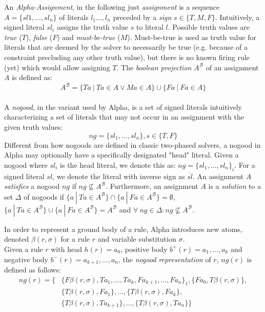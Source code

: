 \begin{definition}
\label{def:prelims-alpha-nogood}	
An \emph{Alpha-Assignment}, in the following just \emph{assignment} is a sequence $A = \{sl1,\ldots,sl_n\}$ of literals $l_1\ldots,l_n$ preceded by a \emph{sign} $s \in \{T, M, F\}$. Intuitively, a signed literal $sl_i$ assigns the truth value $s$ to literal $l$. Possible truth values are \emph{true} ($T$), \emph{false} ($F$) and \emph{must-be-true} ($M$). Must-be-true is used as truth value for literals that are deemed by the solver to necessarily be true (e.g. because of a constraint precluding any other truth value), but there is no known firing rule (yet) which would allow assigning $T$. The \emph{boolean projection} $A^{\mathcal{B}}$ of an assignment $A$ is defined as: 
\[
	A^{\mathcal{B}} = \{ Ta~|~Ta \in A \lor Ma \in A\} \cup \{ Fa~|~Fa \in A\}
\]
\\
A \emph{nogood}, in the variant used by Alpha, is a set of signed literals intuitively characterizing a set of literals that may not occur in an assignment with the given truth values:
\[
	ng = \{ sl_1,\ldots,sl_n \}, s \in \{T, F\}
\]
Different from how nogoods are defined in classic two-phased solvers, a nogood in Alpha may optionally have a specifically designated "head" literal. Given a nogood where $sl_i$ is the head literal, we denote this as: $ng = \{ sl_1,\ldots,sl_n \}_i$. For a signed literal $sl$, we denote the literal with inverse sign as $\overline{sl}$.
An assignment $A$ \emph{satisfies} a nogood $ng$ if $ng \nsubseteq A^{\mathcal{B}}$. Furthermore, an assignment $A$ is a \emph{solution} to a set $\Delta$ of nogoods if $\{a~|~Ta \in A^{\mathcal{B}}\} \cap \{a~|~Fa \in A^{\mathcal{B}}\} = \emptyset$,  $\{a~|~Ta \in A^{\mathcal{B}}\} \cup \{a~|~Fa \in A^{\mathcal{B}}\} = A^{\mathcal{B}}$ and $\forall~ng \in \Delta: ng \nsubseteq A^{\mathcal{B}}$.
\end{definition}

\begin{definition}
\label{def:prelims-alpha-nogood-ruleencoding}		
In order to represent a ground body of a rule, Alpha introduces new atoms, denoted $\beta(r,\sigma)$ for a rule $r$ and variable substitution $\sigma$.\\
Given a rule $r$ with head $h(r) = a_0$, positive body $b^{+}(r) = a_1,\ldots,a_k$ and negative body $b^{-}(r) = a_{k+1},\ldots,a_n$, the \emph{nogood representation} of $r$, $ng(r)$ is defined as follows:
\begin{align*}
	ng(r) = \{&\{F\beta(r,\sigma),Ta_1,\ldots,Ta_k,Fa_{k+1},\ldots,Fa_n\}_1,\{Fa_0,T\beta(r,\sigma)\},\\
			  &\{T\beta(r,\sigma),Fa_1\},\ldots,\{T\beta(r,\sigma),Fa_k\},\\
			  &\{T\beta(r,\sigma),Ta_{k+1}\},\ldots,\{T\beta(r,\sigma),Ta_n\}\}
\end{align*}	
\end{definition}



